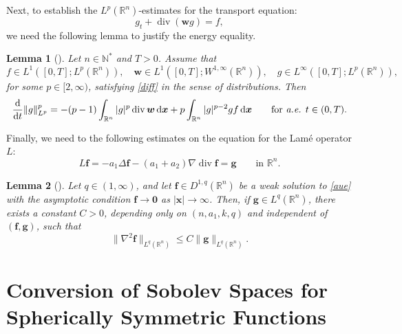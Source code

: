 \documentclass[11pt,reqno]{amsart}
\DeclareMathOperator{\diver}{\mathrm{div}}
\newtheorem{lem}{Lemma}[section]
\numberwithin{rk}{section}
\numberwithin{prop}{section}
\numberwithin{mydef}{section}
\numberwithin{lem}{section}
\numberwithin{equation}{section}
\numberwithin{thm}{section}
\begin{document}
Next, to establish the $L^p(\mathbb{R}^n)$-estimates for the transport equation:
\begin{equation}\label{diff}
g_t+\diver(\boldsymbol{w} g)=f,
\end{equation}
we need the following lemma to justify the energy equality.
\begin{lem}[\cite{CZZ1,lions1}]\label{lemma-lions}
Let $n\in\mathbb{N}^*$ and $T>0$. Assume that
\begin{equation*}
f\in L^1([0,T];L^p(\mathbb{R}^n)),\quad \boldsymbol{w}\in L^1([0,T];W^{1,\infty}(\mathbb{R}^n)),\quad g\in L^\infty([0,T];L^p(\mathbb{R}^n)),
\end{equation*}
for some $p\in[2,\infty)$, satisfying \eqref{diff} in the sense of distributions. Then 
\begin{equation*} 
\frac{\mathrm{d}}{\mathrm{d}t}\|g\|^p_{L^p}=-(p-1)\int_{\mathbb{R}^n}|g|^p\diver \boldsymbol{w}\,\mathrm{d}\boldsymbol{x}+p\int_{\mathbb{R}^n}|g|^{p-2}gf\,\mathrm{d}\boldsymbol{x}  \qquad \text{for {\it a.e.} $t\in (0,T)$}.
\end{equation*}
\end{lem}



Finally, we need to the following estimates on the equation for the Lam\'e operator $L$:
\begin{equation}\label{aue}
L\boldsymbol{f}=-a_1\Delta\boldsymbol{f} -(a_1+a_2)\nabla\diver\boldsymbol{f} =\boldsymbol{g} \qquad\text{in $\mathbb{R}^n$}.
\end{equation}
\begin{lem}[\cite{zhangzhifei}]\label{df3}
Let $q\in (1,\infty)$, and let $\boldsymbol{f}\in D^{1,q}(\mathbb{R}^n)$ 
be a weak solution to \eqref{aue} with the asymptotic condition $\boldsymbol{f}\to \boldsymbol{0}$ as $|\boldsymbol{x}|\to\infty$. 
Then, if $\boldsymbol{g}\in L^q(\mathbb{R}^n)$, there exists a constant $C>0$, depending only on $(n,a_1,k,q)$ and independent of $(\boldsymbol{f},\boldsymbol{g})$, such that
\begin{equation*}
\|\nabla^{2}\boldsymbol{f}\|_{L^q(\mathbb{R}^n)} \leq C\|\boldsymbol{g}\|_{L^q(\mathbb{R}^n)}.
\end{equation*} 
\end{lem}




\medskip
\section{Conversion of Sobolev Spaces for Spherically Symmetric Functions}\label{appb}
\end{document}
